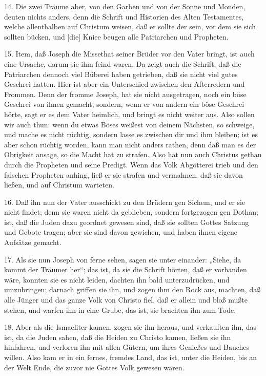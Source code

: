 14. Die zwei Träume aber, von den Garben und von der Sonne und Monden, deuten nichts anders, denn die Schrift und Historien des Alten Testamentes, welche allenthalben auf Christum weisen, daß er sollte der sein, vor dem sie sich sollten bücken, und [die] Kniee beugen alle Patriarchen und Propheten.

15. Item, daß Joseph die Missethat seiner Brüder vor den Vater bringt, ist auch eine Ursache, darum sie ihm feind waren. Da zeigt auch die Schrift, daß die Patriarchen dennoch viel Büberei haben getrieben, daß sie nicht viel gutes Geschrei hatten. Hier ist aber ein Unterschied zwischen den Afterredern und Frommen. Denn der fromme Joseph, hat sie nicht ausgetragen, noch ein böse Geschrei von ihnen gemacht, sondern, wenn er von andern ein böse Geschrei hörte, sagt er es dem Vater heimlich, und bringt es nicht weiter aus. Also sollen wir auch thun: wenn du etwas Böses weißest von deinem Nächsten, so schweige, und mache es nicht rüchtig, sondern lasse es zwischen dir und ihm bleiben; ist es aber schon rüchtig worden, kann man nicht anders rathen, denn daß man es der Obrigkeit ansage, so die Macht hat zu strafen. Also hat nun auch Christus gethan durch die Propheten und seine Predigt. Wenn das Volk Abgötterei trieb und den falschen Propheten anhing, ließ er sie strafen und vermahnen, daß sie davon ließen, und auf Christum warteten.

16. Daß ihn nun der Vater ausschickt zu den Brüdern gen Sichem, und er sie nicht findet; denn sie waren nicht da geblieben, sondern fortgezogen gen Dothan; ist, daß die Juden dazu geordnet gewesen sind, daß sie sollten Gottes Satzung und Gebote tragen; aber sie sind davon gewichen, und haben ihnen eigene Aufsätze gemacht.

17. Als sie nun Joseph von ferne sehen, sagen sie unter einander: „Siehe, da kommt der Träumer her“; das ist, da sie die Schrift hörten, daß er vorhanden wäre, konnten sie es nicht leiden, dachten ihn bald unterzudrücken, und umzubringen; darnach griffen sie ihn, und zogen ihm den Rock aus, machten, daß alle Jünger und das ganze Volk von Christo fiel, daß er allein und bloß mußte stehen, und warfen ihn in eine Grube, das ist, sie brachten ihn zum Tode.

18. Aber als die Ismaeliter kamen, zogen sie ihn heraus, und verkauften ihn, das ist, da die Juden sahen, daß die Heiden zu Christo kamen, ließen sie ihn hinfahren, und verloren ihn mit allen Gütern, um ihres Genießes und Bauches willen. Also kam er in ein fernes, fremdes Land, das ist, unter die Heiden, bis an der Welt Ende, die zuvor nie Gottes Volk gewesen waren.

